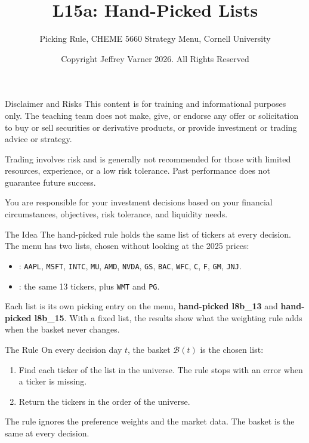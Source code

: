 \documentclass[aspectratio=169,11pt]{beamer}
\title{\texorpdfstring{{\vnheavy L15a}}{L15a}: Hand-Picked Lists}
\subtitle{Picking Rule, CHEME 5660 Strategy Menu, Cornell University}
\author{Copyright Jeffrey Varner 2026. All Rights Reserved}
\begin{document}
\vntitlepage

\begin{frame}{Disclaimer and Risks}
  \vspace{0.6em}
  \textbf{} This content is for training and informational
  purposes only. The teaching team does not make, give, or endorse any offer or
  solicitation to buy or sell securities or derivative products, or provide
  investment or trading advice or strategy.

  \vspace{1.1em}
  \textbf{} Trading involves risk and is generally not recommended for
  those with limited resources, experience, or a low risk tolerance. Past
  performance does not guarantee future success.

  \vspace{1.1em}
  \textbf{} You are responsible for your investment decisions
  based on your financial circumstances, objectives, risk tolerance, and
  liquidity needs.
\end{frame}

\begin{frame}{The Idea}
  \vspace{0.3em}
  The hand-picked rule holds the same list of tickers at every decision. The menu has two lists, chosen without
  looking at the 2025 prices:
  \begin{itemize}\setlength{\itemsep}{0.5em}
    \item {}: \texttt{AAPL}, \texttt{MSFT}, \texttt{INTC}, \texttt{MU}, \texttt{AMD}, \texttt{NVDA}, \texttt{GS}, \texttt{BAC}, \texttt{WFC}, \texttt{C}, \texttt{F}, \texttt{GM}, \texttt{JNJ}.
    \item {}: the same 13 tickers, plus \texttt{WMT} and \texttt{PG}.
  \end{itemize}

  \vspace{0.5em}
  Each list is its own picking entry on the menu, \textbf{hand-picked l8b\_13} and \textbf{hand-picked l8b\_15}.
  With a fixed list, the results show what the weighting rule adds when the basket never changes.
\end{frame}

\begin{frame}{The Rule}
  \vspace{0.3em}
  On every decision day $t$, the basket $\mathcal{B}(t)$ is the chosen list:
  \begin{enumerate}\setlength{\itemsep}{0.5em}
    \item Find each ticker of the list in the universe. The rule stops with an error when a ticker is missing.
    \item Return the tickers in the order of the universe.
  \end{enumerate}

  \vspace{0.5em}
  The rule ignores the preference weights and the market data. The basket is the same at every decision.
\end{frame}
\end{document}
